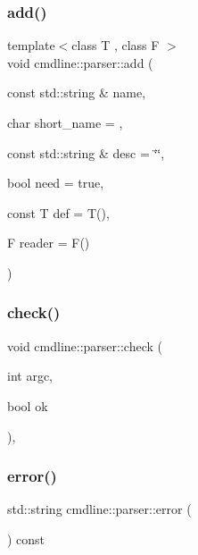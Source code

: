 \mbox{\label{classcmdline_1_1parser_aa6d002a3ef165c240d65c1e87f61a77c}} 
\subsubsection{\texorpdfstring{add()}{add()}\hspace{0.1cm}{\footnotesize\ttfamily [3/3]}}
{\footnotesize\ttfamily template$<$class T , class F $>$ \\
void cmdline\+::parser\+::add (\begin{DoxyParamCaption}\item[{const std\+::string \&}]{name,  }\item[{char}]{short\+\_\+name = {},  }\item[{const std\+::string \&}]{desc = {\ttfamily \char`\"{}\char`\"{}},  }\item[{bool}]{need = {\ttfamily true},  }\item[{const T}]{def = {\ttfamily T()},  }\item[{F}]{reader = {\ttfamily F()} }\end{DoxyParamCaption})\hspace{0.3cm}{\ttfamily [inline]}}

\mbox{\label{classcmdline_1_1parser_aff0a9fa22a3263996f9dff90b16dd661}} 
\subsubsection{\texorpdfstring{check()}{check()}}
{\footnotesize\ttfamily void cmdline\+::parser\+::check (\begin{DoxyParamCaption}\item[{int}]{argc,  }\item[{bool}]{ok }\end{DoxyParamCaption})\hspace{0.3cm}{\ttfamily [inline]}, {\ttfamily [private]}}

\mbox{\label{classcmdline_1_1parser_a9bcaaea243a949bf30a40d938480d303}} 
\subsubsection{\texorpdfstring{error()}{error()}}
{\footnotesize\ttfamily std\+::string cmdline\+::parser\+::error (\begin{DoxyParamCaption}{ }\end{DoxyParamCaption}) const\hspace{0.3cm}{\ttfamily [inline]}}

